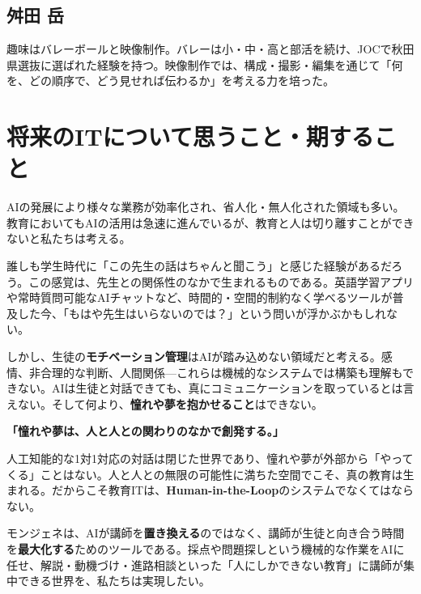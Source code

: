 \documentclass[paper=a4,fontsize=10.5bp,jafontsize=10.5bp,twocolumn]{jlreq}
\begin{document}
\subsection*{舛田 岳}
趣味はバレーボールと映像制作。バレーは小・中・高と部活を続け、JOCで秋田県選抜に選ばれた経験を持つ。映像制作では、構成・撮影・編集を通じて「何を、どの順序で、どう見せれば伝わるか」を考える力を培った。

\section{将来のITについて思うこと・期すること}

AIの発展により様々な業務が効率化され、省人化・無人化された領域も多い。教育においてもAIの活用は急速に進んでいるが、教育と人は切り離すことができないと私たちは考える。

誰しも学生時代に「この先生の話はちゃんと聞こう」と感じた経験があるだろう。この感覚は、先生との関係性のなかで生まれるものである。英語学習アプリや常時質問可能なAIチャットなど、時間的・空間的制約なく学べるツールが普及した今、「もはや先生はいらないのでは？」という問いが浮かぶかもしれない。

しかし、生徒の\textbf{モチベーション管理}はAIが踏み込めない領域だと考える。感情、非合理的な判断、人間関係---これらは機械的なシステムでは構築も理解もできない。AIは生徒と対話できても、真にコミュニケーションを取っているとは言えない。そして何より、\textbf{憧れや夢を抱かせること}はできない。

\begin{highlightbox}
\textbf{「憧れや夢は、人と人との関わりのなかで創発する。」}

人工知能的な1対1対応の対話は閉じた世界であり、憧れや夢が外部から「やってくる」ことはない。人と人との無限の可能性に満ちた空間でこそ、真の教育は生まれる。だからこそ教育ITは、\textbf{Human-in-the-Loop}のシステムでなくてはならない。
\end{highlightbox}

モンジェネは、AIが講師を\textbf{置き換える}のではなく、講師が生徒と向き合う時間を\textbf{最大化する}ためのツールである。採点や問題探しという機械的な作業をAIに任せ、解説・動機づけ・進路相談といった「人にしかできない教育」に講師が集中できる世界を、私たちは実現したい。
\end{document}
